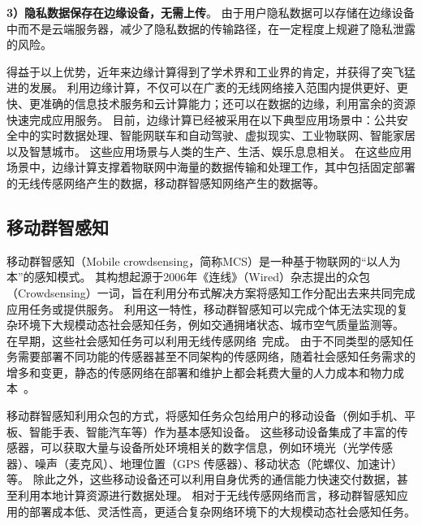 \textbf{3）隐私数据保存在边缘设备，无需上传}。
由于用户隐私数据可以存储在边缘设备中而不是云端服务器，减少了隐私数据的传输路径，在一定程度上规避了隐私泄露的风险。

得益于以上优势，近年来边缘计算得到了学术界和工业界的肯定，并获得了突飞猛进的发展。
利用边缘计算，不仅可以在广袤的无线网络接入范围内提供更好、更快、更准确的信息技术服务和云计算能力；还可以在数据的边缘，利用富余的资源快速完成应用服务。
目前，边缘计算已经被采用在以下典型应用场景中：公共安全中的实时数据处理、智能网联车和自动驾驶、虚拟现实、工业物联网、智能家居以及智慧城市。
这些应用场景与人类的生产、生活、娱乐息息相关。
在这些应用场景中，边缘计算支撑着物联网中海量的数据传输和处理工作，其中包括固定部署的无线传感网络产生的数据，移动群智感知网络产生的数据等。




\subsection{移动群智感知}


移动群智感知（Mobile crowdsensing，简称MCS）是一种基于物联网的“以人为本”的感知模式。
其构想起源于2006年《连线》（Wired）杂志提出的众包（Crowdsensing）一词，旨在利用分布式解决方案将感知工作分配出去来共同完成应用任务或提供服务。
利用这一特性，移动群智感知可以完成个体无法实现的复杂环境下大规模动态社会感知任务，例如交通拥堵状态、城市空气质量监测等。
在早期，这些社会感知任务可以利用无线传感网络~\cite{DBLP:journals/cn/AkyildizSSC02}完成。
由于不同类型的感知任务需要部署不同功能的传感器甚至不同架构的传感网络，随着社会感知任务需求的增多和变更，静态的传感网络在部署和维护上都会耗费大量的人力成本和物力成本~\cite{CNKI/2006/WSNRen}。

移动群智感知利用众包的方式，将感知任务众包给用户的移动设备（例如手机、平板、智能手表、智能汽车等）作为基本感知设备。
这些移动设备集成了丰富的传感器，可以获取大量与设备所处环境相关的数字信息，例如环境光（光学传感器）、噪声（麦克风）、地理位置（GPS 传感器）、移动状态（陀螺仪、加速计）等。
除此之外，这些移动设备还可以利用自身优秀的通信能力快速交付数据，甚至利用本地计算资源进行数据处理。
相对于无线传感网络而言，移动群智感知应用的部署成本低、灵活性高，更适合复杂网络环境下的大规模动态社会感知任务。

